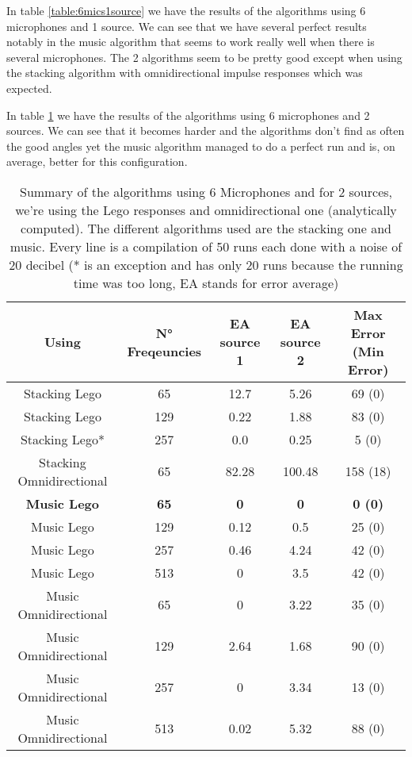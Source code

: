 In table \ref{table:6mics1source} we have the results of the algorithms using 6 microphones and 1 source. We can see that we have several perfect results notably in the music algorithm that seems to work really well when there is several microphones. The 2 algorithms seem to be pretty good except when using the stacking algorithm with omnidirectional impulse responses which was expected.

In table \ref{table:6mics2sources} we have the results of the algorithms using 6 microphones and 2 sources. We can see that it becomes harder and the algorithms don't find as often the good angles yet the music algorithm managed to do a perfect run and is, on average, better for this configuration. 

\begin{table}[H]
   \centering
    \begin{tabular}{|c|c|c|c|c|}
      \hline
      Using & N° Freqeuncies & EA source 1 & EA source 2 & Max Error (Min Error) \\
      \hline
      Stacking Lego & 65 & 12.7 & 5.26 & 69 (0) \\
      Stacking Lego & 129 & 0.22 & 1.88 & 83 (0) \\
      Stacking Lego* & 257 & 0.0 & 0.25 & 5 (0) \\
      
      Stacking Omnidirectional & 65 & 82.28 & 100.48 & 158 (18) \\
      \textbf{Music Lego} & \textbf{65}& \textbf{0} & \textbf{0}& \textbf{0 (0)}\\
      Music Lego & 129 & 0.12 & 0.5 & 25 (0) \\
      Music Lego & 257 & 0.46 & 4.24 & 42 (0) \\
      Music Lego & 513 & 0 & 3.5 & 42 (0) \\
      Music Omnidirectional & 65 & 0 & 3.22 & 35 (0) \\
      Music Omnidirectional & 129 & 2.64 & 1.68 & 90 (0) \\
      Music Omnidirectional & 257 & 0 & 3.34 & 13 (0) \\
      Music Omnidirectional & 513 & 0.02 & 5.32 & 88 (0) \\
      \hline
    \end{tabular}
    \caption{Summary of the algorithms using 6 Microphones and for 2 sources, we're using the Lego responses and omnidirectional one (analytically computed). The different algorithms used are the stacking one and music. Every line is a compilation of 50 runs each done with a noise of 20 decibel (* is an exception and has only 20 runs because the running time was too long, EA stands for error average)}
    \label{table:6mics2sources}
\end{table}


